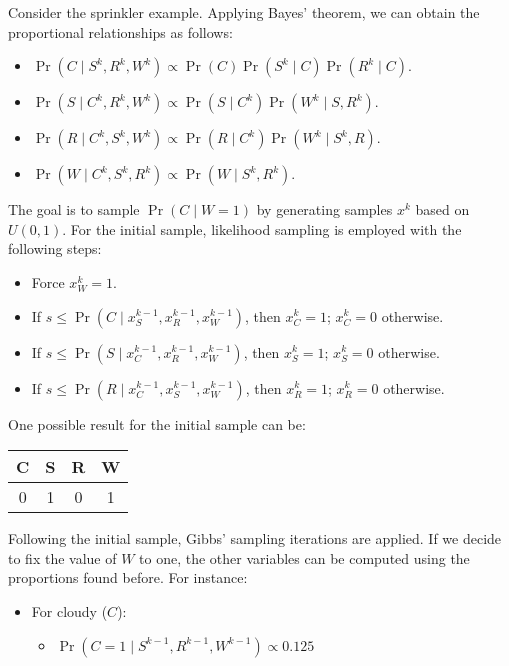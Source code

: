 \begin{example}
    Consider the sprinkler example. 
    Applying Bayes' theorem, we can obtain the proportional relationships as follows:
    \begin{itemize}
        \item $\Pr(C\mid S^k,R^k,W^k) \propto \Pr(C)\Pr(S^k\mid C)\Pr(R^k\mid C)$.
        \item $\Pr(S\mid C^k,R^k,W^k) \propto \Pr(S\mid C^k)\Pr(W^k\mid S,R^k)$.
        \item $\Pr(R\mid C^k,S^k,W^k) \propto \Pr(R\mid C^k)\Pr(W^k\mid S^k,R)$.
        \item $\Pr(W\mid C^k,S^k,R^k) \propto \Pr(W\mid S^k,R^k)$.
    \end{itemize}
    The goal is to sample $\Pr(C\mid W=1)$  by generating samples $x^k$ based on $U(0,1)$. 
    For the initial sample, likelihood sampling is employed with the following steps:
    \begin{itemize}
        \item Force $x_W^k=1$. 
        \item If $ s \leq \Pr(C\mid x_S^{k-1},x_R^{k-1},x_W^{k-1})$, then $x_C^k=1$; $x_C^k=0$ otherwise. 
        \item If $ s \leq \Pr(S\mid x_C^{k-1},x_R^{k-1},x_W^{k-1})$, then $x_S^k=1$; $x_S^k=0$ otherwise. 
        \item If $ s \leq \Pr(R\mid x_C^{k-1},x_S^{k-1},x_W^{k-1})$, then $x_R^k=1$; $x_R^k=0$ otherwise. 
    \end{itemize}
    One possible result for the initial sample can be:
    \begin{table}[H]
        \centering
        \begin{tabular}{cccc}
        \hline
        \textbf{C} & \textbf{S} & \textbf{R} & \textbf{W} \\ \hline
        0          & 1          & 0          & 1          \\ \hline
        \end{tabular}
    \end{table}
    Following the initial sample, Gibbs' sampling iterations are applied.
    If we decide to fix the value of $W$ to one, the other variables can be computed using the proportions found before. 
    For instance:    
    \begin{itemize}
        \item For cloudy ($C$):
            \begin{itemize}
                \item $\Pr(C=1\mid S^{k-1},R^{k-1},W^{k-1}) \propto 0.125$

\end{itemize}
\end{itemize}
\end{example}
